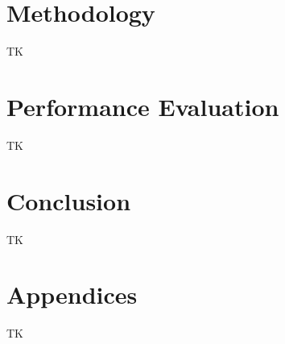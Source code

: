 \documentclass[fleqn,10pt]{olplainarticle}
\begin{document}
\section{Methodology}
TK

\section{Performance Evaluation}
TK

\section{Conclusion}
TK

\nocite{*}


\section*{Appendices}
TK
\end{document}
